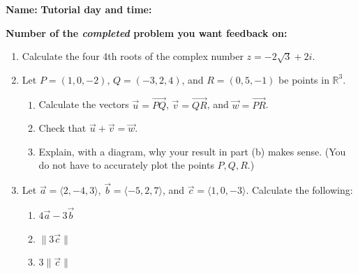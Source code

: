 \documentclass[12pt]{article}
\newcommand{\len}[1]{\lVert #1\rVert}
\newcommand{\R}{\mathbb{R}}
\begin{document}
{\bf \large Name:} \hspace{2.5in} {\bf Tutorial day and time:}

\bigskip

{\bf Number of the {\em completed} problem you want feedback on:}

\bigskip

\thispagestyle{fancy}

 \begin{enumerate}
 \item Calculate the four 4th roots of the complex number $z=-2\sqrt{3}+2i$.

\vspace{2.75in}


 \item  Let $P=(1,0,-2)$, $Q=(-3,2,4)$, and $R=(0,5,-1)$ be points in $\R^3$.
\begin{enumerate}
 \item Calculate the vectors $\vec{u}=\overrightarrow{PQ}$, $\vec{v}=\overrightarrow{QR}$, and $\vec{w}=\overrightarrow{PR}$.

\vspace{1.75in}

 \item Check that $\vec{u}+\vec{v} = \vec{w}$.

\vspace{0.75in}

 \item Explain, with a diagram, why your result in part (b) makes sense. (You do not have to accurately plot the points $P,Q,R$.)


\end{enumerate}
\newpage

\item Let $\vec{a} = \langle 2,-4,3\rangle$, $\vec{b} = \langle -5, 2, 7\rangle$, and $\vec{c} = \langle 1,0,-3\rangle$. Calculate the following:
\begin{enumerate}
 \item $4\vec{a}-3\vec{b}$

\vspace{2.5cm}

 \item $\len{3\vec{c}}$

\vspace{2.5cm}

 \item $3\len{\vec{c}}$

\vspace{2.5cm}


\end{enumerate}
\end{enumerate}
\end{document}
